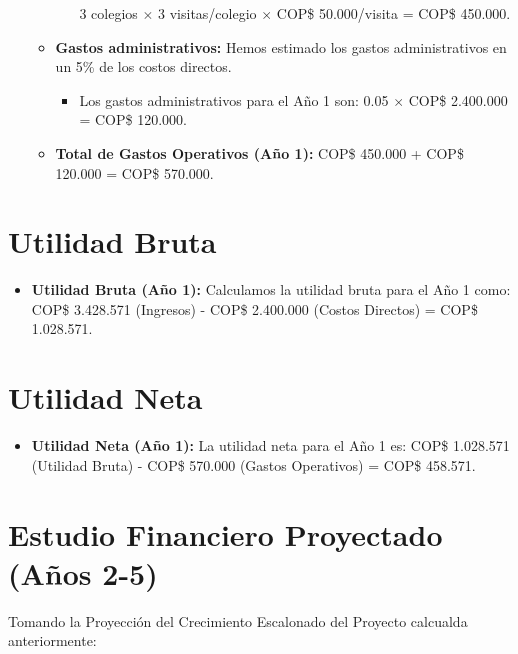 \begin{itemize}
\begin{itemize}
\begin{itemize}
            3 colegios $\times$ 3 visitas/colegio $\times$
            COP\$ 50.000/visita = COP\$ 450.000.
        \end{itemize}
      \item \textbf{Gastos administrativos:} Hemos estimado los gastos
        administrativos en un 5\% de los costos directos.
        \begin{itemize}
          \item Los gastos administrativos para el Año 1 son:
            0.05 $\times$ COP\$ 2.400.000 = COP\$ 120.000.
        \end{itemize}
      \item \textbf{Total de Gastos Operativos (Año 1):}
        COP\$ 450.000 + COP\$ 120.000 = COP\$ 570.000.
    \end{itemize}
\end{itemize}

\section{Utilidad Bruta}

\begin{itemize}
  \item \textbf{Utilidad Bruta (Año 1):} Calculamos la utilidad bruta para el
    Año 1 como:
    COP\$ 3.428.571 (Ingresos) - COP\$ 2.400.000 (Costos Directos) = COP\$ 1.028.571.
\end{itemize}

\section{Utilidad Neta}

\begin{itemize}
  \item \textbf{Utilidad Neta (Año 1):} La utilidad neta para el Año 1 es:
    COP\$ 1.028.571 (Utilidad Bruta) - COP\$ 570.000 (Gastos Operativos) =
    COP\$ 458.571.
\end{itemize}

\section{Estudio Financiero Proyectado (Años 2-5)}

Tomando la Proyección del Crecimiento Escalonado del Proyecto calcualda
anteriormente:

